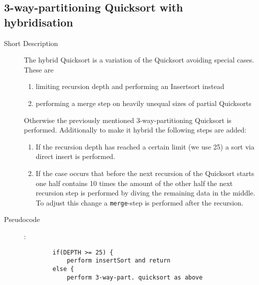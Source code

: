 \documentclass[11pt]{amsart}
\begin{document}
\subsection{3-way-partitioning Quicksort with hybridisation}
\begin{description}
	\item[Short Description] The hybrid Quicksort is a variation of the Quicksort avoiding special cases. These are
	\begin{enumerate}
		\item limiting recursion depth and performing an Insertsort instead
		\item performing a merge step on heavily unequal sizes of partial Quicksorts
	\end{enumerate}
Otherwise the previously mentioned 3-way-partitioning Quicksort is performed. Additionally to make it hybrid the following steps are added:
		\begin{enumerate}
			\item If the recursion depth has reached a certain limit (we use 25) a sort via direct insert is performed.
			\item If the case occurs that before the next recursion of the Quicksort starts one half contains 10 times the amount of the other half the next recursion step is performed by diving the remaining data in the middle. To adjust this change a \texttt{merge}-step is performed after the recursion.
		\end{enumerate}
	\item[Pseudocode]:
		\begin{lstlisting}
		if(DEPTH >= 25) {
			perform insertSort and return
		else {
			perform 3-way-part. quicksort as above
			

\end{lstlisting}
\end{description}
\end{document}
